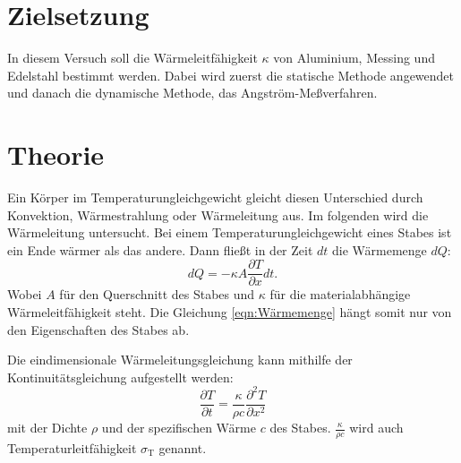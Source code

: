 \section{Zielsetzung}
\label{Zielsetzung}
In diesem Versuch soll die Wärmeleitfähigkeit $\kappa $ von Aluminium, Messing und Edelstahl bestimmt werden.
Dabei wird zuerst die statische Methode angewendet und danach die dynamische Methode, das Angström-Meßverfahren.

\section{Theorie}
\label{Theorie}
Ein Körper im Temperaturungleichgewicht gleicht diesen Unterschied durch Konvektion, Wärmestrahlung oder Wärmeleitung aus.
Im folgenden wird die Wärmeleitung untersucht.
Bei einem Temperaturungleichgewicht eines Stabes ist ein Ende wärmer als das andere.
Dann fließt in der Zeit $dt$ die Wärmemenge $dQ$:
\begin{equation}\label{eqn:Wärmemenge}
    dQ = -\kappa A \frac{\partial T}{\partial x}dt .
\end{equation}
Wobei $A$ für den Querschnitt des Stabes und $\kappa$ für die materialabhängige Wärmeleitfähigkeit steht.
Die Gleichung \eqref{eqn:Wärmemenge} hängt somit nur von den Eigenschaften des Stabes ab.

Die eindimensionale Wärmeleitungsgleichung kann mithilfe der Kontinuitätsgleichung aufgestellt werden:
\begin{equation*}
    \frac{\partial T}{\partial t} = \frac{\kappa}{\rho c} \frac{\partial^2 T}{\partial x^2}
\end{equation*}
mit der Dichte $\rho$ und der spezifischen Wärme $c$ des Stabes.
$\frac{\kappa}{\rho c}$ wird auch Temperaturleitfähigkeit $\sigma_\text{T}$ genannt.

